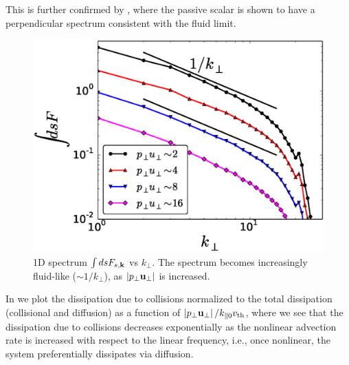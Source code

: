     This is further confirmed by , where the passive scalar is shown
    to have a perpendicular spectrum consistent with the fluid limit.
    \begin{figure}
    \begin{center}
        \includegraphics[width=14.8cm]{figs/phmixnlpp0/M100_vskp.eps}
        \caption{1D spectrum $\int ds F_{s,\mathbf{k}}$ vs $k_\perp$. The spectrum becomes
        increasingly fluid-like ($\sim1/k_\perp$), as $\left|p_\perp \mathbf{u_\perp}\right|$ is increased.}
        \label{pp0:fig:vskp}
    \end{center}
    \end{figure}

    In  we plot the dissipation due to collisions normalized to the
    total dissipation (collisional and diffusion) as a function of $\left|p_\perp \mathbf{u_\perp}\right|/k_{\parallel0}v_{\rm th}$,
    where we see that the dissipation due to collisions decreases
    exponentially as the nonlinear advection rate is increased with respect to the linear
    frequency, i.e., once nonlinear, the system preferentially dissipates via diffusion.
    
